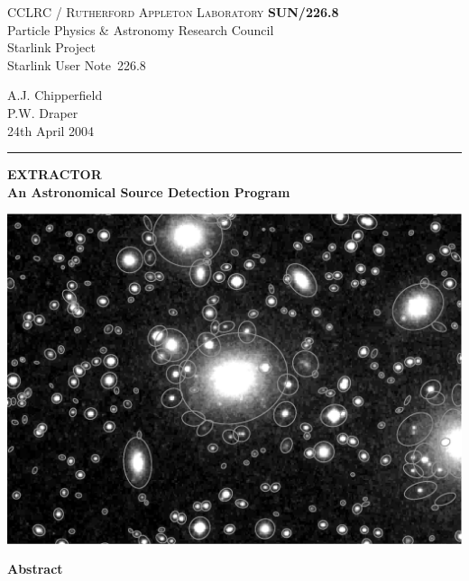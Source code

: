 \documentclass[twoside,11pt]{article}
\newcommand{\stardoccategory}  {Starlink User Note}
\newcommand{\stardocinitials}  {SUN}
\newcommand{\stardocnumber}    {226.8}
\newcommand{\stardocauthors}   {A.J. Chipperfield\\
                                P.W. Draper}
\newcommand{\stardocdate}      {24th April 2004}
\newcommand{\stardoctitle}     {EXTRACTOR\\
                                An Astronomical Source Detection Program}
\newcommand{\stardocname}{\stardocinitials /\stardocnumber}
\newenvironment{latexonly}{}{}
\renewcommand{\_}{\texttt{\symbol{95}}}
\begin{document}
\thispagestyle{empty}

\begin{latexonly}
   CCLRC / \textsc{Rutherford Appleton Laboratory} \hfill \textbf{\stardocname}\\
   {\large Particle Physics \& Astronomy Research Council}\\
   {\large Starlink Project\\}
   {\large \stardoccategory\ \stardocnumber}
   \begin{flushright}
   \stardocauthors\\
   \stardocdate
   \end{flushright}
   \vspace{-4mm}
   \rule{\textwidth}{0.5mm}
   \vspace{4mm}
   \begin{center}
   {\LARGE\textbf{\stardoctitle} \\ [2.5ex]}
   \vspace{4mm}

   \includegraphics[scale=0.6]{sun226fig.ps}
   \end{center}

   \vspace{5mm}
   \begin{center}
      {\Large\textbf{Abstract}}
   \end{center}
\end{latexonly}
\end{document}
